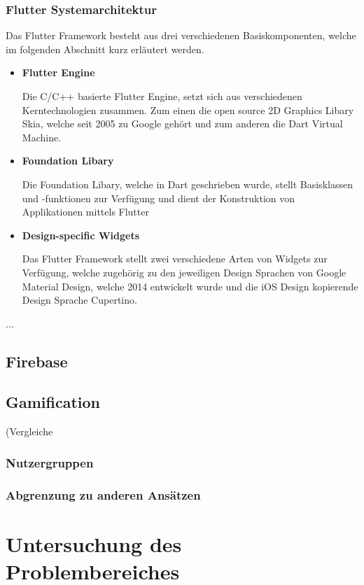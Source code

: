 \documentclass{scrreprt}
\begin{document}
\subsection{Flutter Systemarchitektur} 
Das Flutter Framework besteht aus drei verschiedenen Basiskomponenten, welche im folgenden Abschnitt kurz erläutert werden.
\begin{itemize}
\item{\textbf{Flutter Engine}}

Die C/C++ basierte Flutter Engine, setzt sich aus verschiedenen Kerntechnologien zusammen. Zum einen die open source 2D Graphics Libary Skia\cite{Skia1}, welche seit 2005 zu Google gehört und zum anderen die Dart Virtual Machine.
\item{\textbf{Foundation Libary}}

Die Foundation Libary, welche in Dart geschrieben wurde, stellt Basisklassen und -funktionen zur Verfügung und dient der Konstruktion von Applikationen mittels Flutter
\item{\textbf{Design-specific Widgets}}

Das Flutter Framework stellt zwei verschiedene Arten von Widgets zur Verfügung, welche zugehörig zu den jeweiligen Design Sprachen von Google Material Design\cite{Mat1}, welche 2014 entwickelt wurde und die iOS Design kopierende Design Sprache Cupertino\cite{Cup1}.
\end{itemize}

		...

\section{Firebase}

\section{Gamification}
(Vergleiche \cite{Strahringer2017}
\subsection{Nutzergruppen}
\subsection{Abgrenzung zu anderen Ansätzen}


\chapter{Untersuchung des Problembereiches} \label{chap:problemanalyse}
\end{document}
